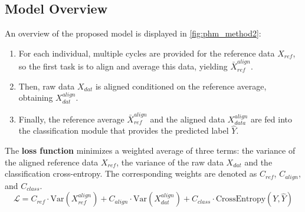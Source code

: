 \subsection{Model Overview}
An overview of the proposed model is displayed in \cref{fig:phm_method2}:
\begin{enumerate}
    \item For each individual, multiple cycles are provided for the reference data $X_{ref}$, so the first task is to align and average this data, yielding $\bar{X}_{ref}^{align}$. 
    \item Then, raw data $X_{dat}$ is aligned conditioned on the reference average, obtaining $X_{dat}^{align}$. 
    \item Finally, the reference average $\bar{X}_{ref}^{align}$ and the aligned data $X_{data}^{align}$ are fed into the classification module that provides the predicted label $\hat{Y}$.
\end{enumerate}



The \textbf{loss function} minimizes a weighted average of three terms: the variance of the aligned reference data  $X_{ref}$, the variance of the raw data $X_{dat}$ and the classification cross-entropy. The corresponding weights are denoted as $C_{ref}$, $C_{align}$, and $C_{class}$.
\begin{equation}
    \mathcal{L} = C_{ref} \cdot \text{Var}(X_{ref}^{align}) + C_{align} \cdot \text{Var}(X_{dat}^{align}) + C_{class} \cdot \text{CrossEntropy}(Y, \hat{Y})
\end{equation}

